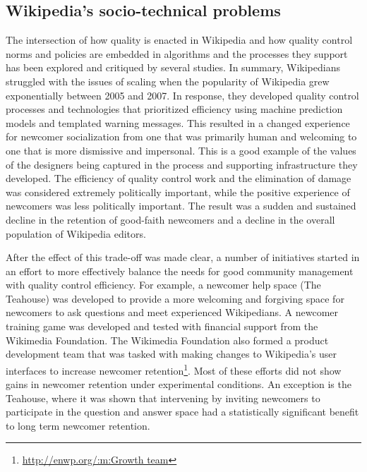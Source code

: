\subsection{Wikipedia's socio-technical problems}
The intersection of how quality is enacted in Wikipedia and how quality control norms and policies are embedded in algorithms and the processes they support has been explored and critiqued by several studies\cite{halfaker2013rise}\cite{morgan2013tea}\cite{halfaker2014snuggle}.  In summary, Wikipedians struggled with the issues of scaling when the popularity of Wikipedia grew exponentially between 2005 and 2007\cite{halfaker2013rise}.  In response, they developed quality control processes and technologies that prioritized efficiency using machine prediction models\cite{halfaker2014snuggle} and templated warning messages\cite{halfaker2013rise}.  This resulted in a changed experience for newcomer socialization from one that was primarily human and welcoming to one that is more dismissive and impersonal\cite{morgan2013tea}.  This is a good example of the values of the designers being captured in the process and supporting infrastructure they developed\cite{halfaker2014snuggle}.  The efficiency of quality control work and the elimination of damage was considered extremely politically important, while the positive experience of newcomers was less politically important.  The result was a sudden and sustained decline in the retention of good-faith newcomers and a decline in the overall population of Wikipedia editors\cite{halfaker2013rise}.

After the effect of this trade-off was made clear, a number of initiatives started in an effort to more effectively balance the needs for good community management with quality control efficiency.  For example, a newcomer help space (The Teahouse\cite{morgan2013tea}) was developed to provide a more welcoming and forgiving space for newcomers to ask questions and meet experienced Wikipedians.  A newcomer training game was developed and tested with financial support from the Wikimedia Foundation\cite{narayan2015effects}.  The Wikimedia Foundation also formed a product development team that was tasked with making changes to Wikipedia's user interfaces to increase newcomer retention\footnote{\url{http://enwp.org/:m:Growth team}}.  Most of these efforts did not show gains in newcomer retention under experimental conditions.  An exception is the Teahouse, where it was shown that intervening by inviting newcomers to participate in the question and answer space had a statistically significant benefit to long term newcomer retention\cite{morgan2018evaluating}.

